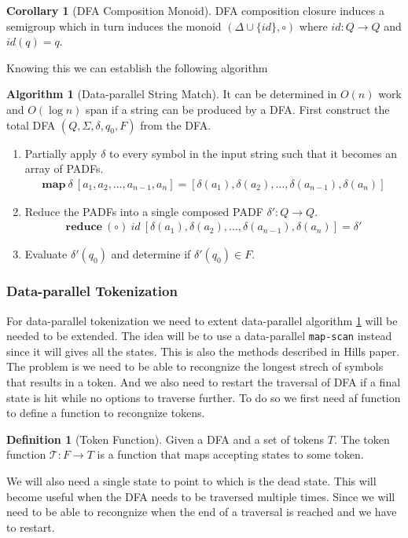 \documentclass[a4paper,12pt]{article}
\theoremstyle{definition}
\newtheorem{definition}{Definition}[section]
\newtheorem{corollary}{Corollary}[section]
\newtheorem{algorithm}{Algorithm}[section]
\begin{document}
\begin{corollary}[DFA Composition Monoid]
  DFA composition closure induces a semigroup which in turn induces the monoid $(\Delta \cup \{id\}, \circ)$ where $id: Q \to Q$ and $id(q) = q$.
\end{corollary}
\noindent Knowing this we can establish the following algorithm
\begin{algorithm}[Data-parallel String Match]\label{algo:lex}
  It can be determined in $O(n)$ work and $O(\log n)$ span if a string can be produced by a DFA. First construct the total DFA $(Q, \Sigma, \delta, q_0, F)$ from the DFA.
  \begin{enumerate}
    \item Partially apply $\delta$ to every symbol in the input string such that it becomes an array of PADFs.
    \begin{align*}
      \mathbf{map}\: \delta \: [a_1, a_2, \dots, a_{n - 1}, a_n] = [\delta(a_1), \delta(a_2), \dots, \delta(a_{n - 1}), \delta(a_n)]
    \end{align*}
    \item Reduce the PADFs into a single composed PADF $\delta': Q \to Q$. \begin{align*}
      \mathbf{reduce} \: (\circ) \: id \: [\delta(a_1), \delta(a_2), \dots, \delta(a_{n - 1}), \delta(a_n)] = \delta'
    \end{align*}
    \item Evaluate $\delta'(q_0)$ and determine if $\delta'(q_0) \in F$.
  \end{enumerate}
\end{algorithm}

\subsubsection{Data-parallel Tokenization}
For data-parallel tokenization we need to extent data-parallel algorithm \ref{algo:lex} will be needed to be extended. The idea will be to use a data-parallel \texttt{map-scan} instead since it will gives all the states. This is also the methods described in Hills \cite{HILL1992699} paper. The problem is we need to be able to recongnize the longest strech of symbols that results in a token. And we also need to restart the traversal of DFA if a final state is hit while no options to traverse further. To do so we first need af function to define a function to recongnize tokens.

\begin{definition}[Token Function]
  Given a DFA and a set of tokens $T$. The token function $\mathcal{T}: F \to T$ is a function that maps accepting states to some token.
\end{definition}
\noindent We will also need a single state to point to which is the dead state. This will become useful when the DFA needs to be traversed multiple times. Since we will need to be able to recongnize when the end of a traversal is reached and we have to restart.
\end{document}

